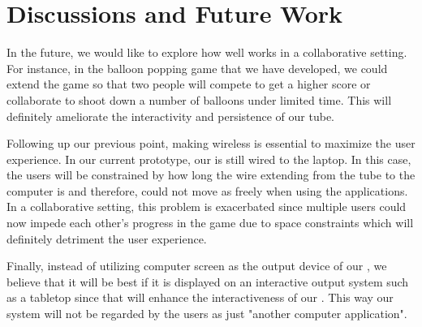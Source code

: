 \section{Discussions and Future Work}\label{sec:fut-work}

In the future, we would like to explore how well \tube works in a collaborative setting. For instance, in the balloon popping game that we have developed, we could extend the game so that two people will compete to get a higher score or collaborate to shoot down a number of balloons under limited time. This will definitely ameliorate the interactivity and persistence of our tube.

Following up our previous point, making \tube wireless is essential to maximize the user experience. In our current prototype, our \tube is still wired to the laptop. In this case, the users will be constrained by how long the wire extending from the tube to the computer is and therefore, could not move as freely when using the applications. In a collaborative setting, this problem is exacerbated since multiple users could now impede each other's progress in the game due to space constraints which will definitely detriment the user experience.

Finally, instead of utilizing computer screen as the output device of our \tube, we believe that it will be best if it is displayed on an interactive output system such as a tabletop since that will enhance the interactiveness of our \tube. This way our \tube system will not be regarded by the users as just "another computer application".
